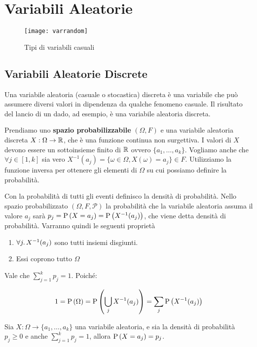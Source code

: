 \chapter{Variabili Aleatorie}

\begin{figure}[H]
	\centering
	\caption{Tipi di variabili casuali}
	\texttt{[image: varrandom]}
\end{figure}

\section{Variabili Aleatorie Discrete}

\begin{defn}
	Una variabile aleatoria (casuale o stocastica) discreta è una variabile che può assumere diversi valori in dipendenza da qualche fenomeno casuale.
	Il risultato del lancio di un dado, ad esempio, è una variabile aleatoria discreta.
	
	Prendiamo uno \textbf{spazio probabilizzabile} $ (\Omega, F) $ e una variabile aleatoria discreta $ X : \Omega \to \mathbb{R} $, che è una funzione continua non surgettiva. I valori di $ X $ devono essere un sottoinsieme finito di $ \mathbb{R} $ ovvero $ \{a_1, \dots, a_k\} $.
	Vogliamo anche che $ \forall j \in [1, k] $ sia vero $ X^{-1}(a_j) = \{ \omega \in \Omega, X(\omega) = a_j\} \in F $. Utilizziamo la funzione inversa per ottenere gli elementi di $ \Omega $ su cui possiamo definire la probabilità.
	
	Con la probabilità di tutti gli eventi definisco la densità di probabilità. Nello spazio probabilizzato $ (\Omega, F, \mathcal{P}) $ la probabilità che la variabile aleatoria assuma il valore $ a_j $ sarà $ p_j = \text{P}\left(X = a_j\right) = \text{P}\left(X^{-1}(a_j)\right) $, che viene detta densità di probabilità. Varranno quindi le seguenti proprietà
	
	\begin{enumerate}
		\item $ \forall j \ldotp X^{-1} (a_j) $ sono tutti insiemi disgiunti.
		\item Essi coprono tutto $ \Omega $
	\end{enumerate}
	Vale che $ \sum_{j=1}^{k} p_j = 1 $. Poiché:
	
	\begin{equation*}
		1 = \text{P}\left(\Omega\right) = \text{P}\left(\bigcup_{j} X^{-1}(a_j)\right) = \sum_{j} \text{P}\left(X^{-1}(a_j)\right)
	\end{equation*}
	
	Sia $ X : \Omega \to \{ a_1, \dots, a_k \} $ una variabile aleatoria, e sia la densità di probabilità $ p_j \geq 0 $ e anche  $ \sum_{j=1}^{k} p_j = 1 $, allora $ \text{P}\left(X = a_j\right) = p_j $.
	

\end{defn}
